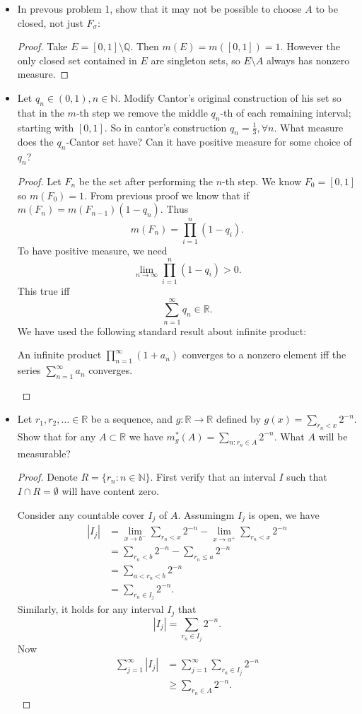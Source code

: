
\begin{itemize}
	\item In prevous problem 1, show that it may not be possible to choose $A$ to be closed, not just $F_\sigma$: 
\begin{proof}
	Take $E = [0,1] \setminus \mathbb{Q}$. Then $m(E) = m\left( [0,1] \right) = 1$. However the only closed set contained in $E$ are singleton sets, so $E\setminus A$ always has nonzero measure. 
\end{proof}

	\item Let $q_n \in (0,1), n \in \mathbb{N}$. Modify Cantor's original construction of his set so that in the $m$-th step we remove the middle $q_n$-th of each remaining interval; starting with $[0,1]$. So in cantor's construction $q_n = \frac{1}{3}, \forall n$. What measure does the $q_n$-Cantor set have? Can it have positive measure for some choice of $q_n$?
\begin{proof}
	Let $F_n$ be the set after performing the $n$-th step. We know $F_0 = [0,1]$ so $m(F_0) = 1$. From previous proof we know that if  $m(F_n) = m(F_{n-1})(1 - q_n)$. Thus
	\[
		m(F_n) = \prod_{i = 1}^{n} (1 - q_i) 
	.\] 
	To have positive measure, we need
	\[
		\lim_{n \to \infty} \prod_{i = 1}^{n} (1 - q_i) > 0
	.\] 
	This true iff
	\[
		\sum_{n=1}^{\infty} q_n \in \mathbb{R}
	.\] 
	We have used the following standard result about infinite product:
	\begin{proposition}
		An infinite product $\prod_{n=1}^{\infty}  (1 + a_n)$ converges to a nonzero element iff the series $\sum_{n=1}^{\infty} a_n$ converges.
	\end{proposition}
\end{proof}

\newpage
	\item Let $r_1, r_2,\ldots \in \mathbb{R}$ be a sequence, and $g: \mathbb{R} \to  \mathbb{R}$ defined by $g(x) = \sum_{r_n < x}2^{-n}$. Show that for any $A \subset \mathbb{R}$ we have $m^* _g(A) = \sum_{n: r_n \in A} 2^{-n}$. What $A$ will be measurable?
\begin{proof}
	Denote $R = \{r_n: n \in \mathbb{N}\}$. First verify that an interval $I$ such that $I \cap R = \emptyset $ will have content zero. 

	Consider any countable cover $I_j$ of $A$. Assumingm $I_j$ is open, we have
	\begin{align*}
		|I_j|
		&=  \lim_{x \to b^-} \sum_{r_n < x}{2^{-n}}  - \lim_{x \to a^+} \sum_{r_n < x} 2^{-n}   \\
		&= \sum_{r_n < b} 2^{-n} - \sum_{r_n \le a} 2^{-n} \\
		&= \sum_{a < r_n < b} 2^{-n}\\
		&= \sum_{r_n \in I_j} 2^{-n} 
	.\end{align*}
	Similarly, it holds for any interval $I_j$ that
	\[
		|I_j| = \sum_{r_n \in I_j} 2^{-n}
	.\] 
	Now
	\begin{align*}
		\sum_{j=1}^{\infty} |I_j|
		&= \sum_{j=1}^{\infty} \sum_{r_n \in I_j} 2^{-n}\\
		&\ge \sum_{r_n \in A} 2^{-n}
	.\end{align*}


\end{proof}
\end{itemize}
